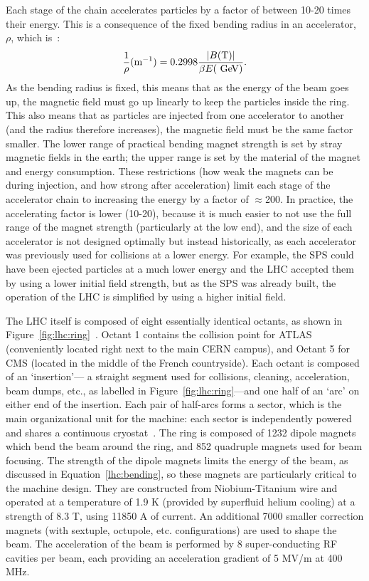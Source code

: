 Each stage of the chain accelerates particles by a factor of between 10-20 times their energy. This is a consequence of the fixed bending radius in an accelerator, $\rho$, which is~\cite{accelerator-book}:
%
\begin{equation}
\label{lhc:bending}
\frac{1}{\rho} (\mathrm{m}^{-1}) = 0.2998 \frac{|B (\mathrm{T})|}{\beta E (\GeV)}.
\end{equation}
%
As the bending radius is fixed, this means that as the energy of the beam goes up, the magnetic field must go up linearly to keep the particles inside the ring. This also means that as particles are injected from one accelerator to another (and the radius therefore increases), the magnetic field must be the same factor smaller. The lower range of practical bending magnet strength is set by stray magnetic fields in the earth; the upper range is set by the material of the magnet and energy consumption. These restrictions (how weak the magnets can be during injection, and how strong after acceleration) limit each stage of the accelerator chain to increasing the energy by a factor of $\approx$200. In practice, the accelerating factor is lower (10-20), because it is much easier to not use the full range of the magnet strength (particularly at the low end), and the size of each accelerator is not designed optimally but instead historically, as each accelerator was previously used for collisions at a lower energy. For example, the SPS could have been ejected particles at a much lower energy and the LHC accepted them by using a lower initial field strength, but as the SPS was already built, the operation of the LHC is simplified by using a higher initial field. 


The LHC itself is composed of eight essentially identical octants, as shown in Figure~\ref{fig:lhc:ring}~\cite{LHCGuide}. Octant 1 contains the collision point for ATLAS (conveniently located right next to the main CERN campus), and Octant 5 for CMS (located in the middle of the French countryside). Each octant is composed of an `insertion'--- a straight segment used for collisions, cleaning, acceleration, beam dumps, etc., as labelled in Figure~\ref{fig:lhc:ring}---and one half of an `arc' on either end of the insertion. Each pair of half-arcs forms a sector, which is the main organizational unit for the machine: each sector is independently powered and shares a continuous cryostat~\cite{LHC2008-2013}. The ring is composed of 1232 dipole magnets which bend the beam around the ring, and 852 quadruple magnets used for beam focusing. The strength of the dipole magnets limits the energy of the beam, as discussed in Equation~\ref{lhc:bending}, so these magnets are particularly critical to the machine design. They are constructed from Niobium-Titanium wire and operated at a temperature of 1.9 K (provided by superfluid helium cooling) at a strength of 8.3 T, using 11850 A of current. An additional 7000 smaller correction magnets (with sextuple, octupole, etc. configurations) are used to shape the beam. The acceleration of the beam is performed by 8 super-conducting RF cavities per beam, each providing an acceleration gradient of 5 MV/m at 400 MHz. 


